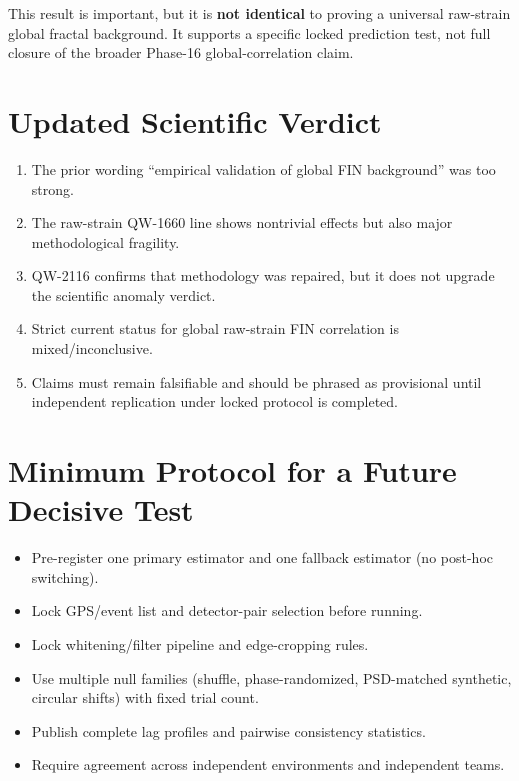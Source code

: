 \documentclass[11pt,a4paper]{article}
\begin{document}
This result is important, but it is \textbf{not identical} to proving a universal raw-strain global fractal background. It supports a specific locked prediction test, not full closure of the broader Phase-16 global-correlation claim.

\section{Updated Scientific Verdict}
\begin{enumerate}[leftmargin=1.5em]
    \item The prior wording ``empirical validation of global FIN background'' was too strong.
    \item The raw-strain QW-1660 line shows nontrivial effects but also major methodological fragility.
    \item QW-2116 confirms that methodology was repaired, but it does not upgrade the scientific anomaly verdict.
    \item Strict current status for global raw-strain FIN correlation is mixed/inconclusive.
    \item Claims must remain falsifiable and should be phrased as provisional until independent replication under locked protocol is completed.
\end{enumerate}

\section{Minimum Protocol for a Future Decisive Test}
\begin{itemize}[leftmargin=1.5em]
    \item Pre-register one primary estimator and one fallback estimator (no post-hoc switching).
    \item Lock GPS/event list and detector-pair selection before running.
    \item Lock whitening/filter pipeline and edge-cropping rules.
    \item Use multiple null families (shuffle, phase-randomized, PSD-matched synthetic, circular shifts) with fixed trial count.
    \item Publish complete lag profiles and pairwise consistency statistics.
    \item Require agreement across independent environments and independent teams.
\end{itemize}
\end{document}
